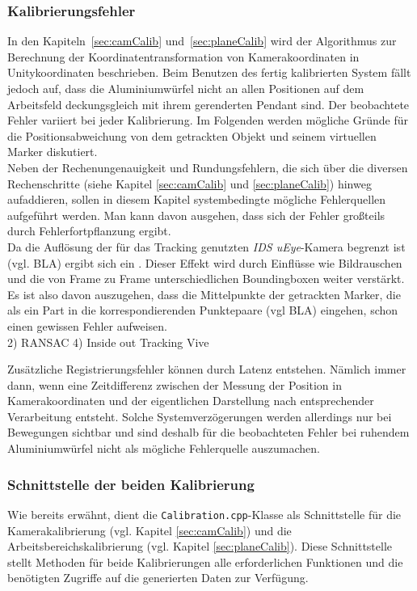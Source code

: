 \subsubsection{Kalibrierungsfehler} \label{sec:calibError}
In den Kapiteln~\ref{sec:camCalib} und~\ref{sec:planeCalib} wird der Algorithmus zur Berechnung der Koordinatentransformation von Kamerakoordinaten in Unitykoordinaten beschrieben. Beim Benutzen des fertig kalibrierten System fällt jedoch auf, dass die Aluminiumwürfel nicht an allen Positionen auf dem Arbeitsfeld deckungsgleich mit ihrem gerenderten Pendant sind. Der beobachtete Fehler variiert bei jeder Kalibrierung. Im Folgenden werden mögliche Gründe für die Positionsabweichung von dem getrackten Objekt und seinem virtuellen Marker  diskutiert. \\
Neben der Rechenungenauigkeit und Rundungsfehlern, die sich über die diversen Rechenschritte (siehe Kapitel \ref{sec:camCalib} und \ref{sec:planeCalib}) hinweg aufaddieren, sollen in diesem Kapitel systembedingte mögliche Fehlerquellen aufgeführt werden. Man kann davon ausgehen, dass sich der Fehler großteils durch Fehlerfortpflanzung \cite{schmalstieg2016augmented} ergibt.\\ 
Da die Auflösung der für das Tracking genutzten \textit{IDS uEye}-Kamera begrenzt ist (vgl. BLA) ergibt sich ein . Dieser Effekt wird durch Einflüsse wie Bildrauschen und die von Frame zu Frame unterschiedlichen Boundingboxen weiter verstärkt. Es ist also davon auszugehen, dass die Mittelpunkte der getrackten Marker, die als ein Part in die korrespondierenden Punktepaare (vgl BLA) eingehen, schon einen gewissen Fehler aufweisen. \\



2) RANSAC
4) Inside out Tracking Vive


Zusätzliche Registrierungsfehler können durch Latenz entstehen. Nämlich immer dann, wenn eine Zeitdifferenz zwischen der Messung der Position in Kamerakoordinaten und der eigentlichen Darstellung nach entsprechender
Verarbeitung entsteht. Solche Systemverzögerungen werden allerdings nur bei Bewegungen sichtbar und sind deshalb für die beobachteten Fehler bei ruhendem Aluminiumwürfel nicht als mögliche Fehlerquelle auszumachen. 



\subsubsection{Schnittstelle der beiden Kalibrierung} \label{sec:CalibSteuerung}
Wie bereits erwähnt, dient die \texttt{Calibration.cpp}-Klasse als Schnittstelle für die Kamerakalibrierung (vgl. Kapitel \ref{sec:camCalib}) und die Arbeitsbereichskalibrierung (vgl. Kapitel \ref{sec:planeCalib}). Diese Schnittstelle stellt Methoden für beide Kalibrierungen alle erforderlichen Funktionen und die benötigten Zugriffe auf die generierten Daten zur Verfügung. 

